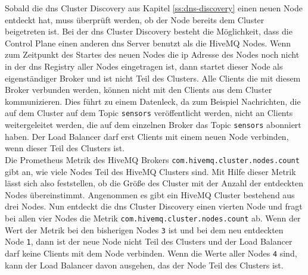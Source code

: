 Sobald die \ac{dns} Cluster Discovery aus Kapitel \ref{ss:dns-discovery} einen neuen Node entdeckt hat, muss überprüft werden, ob der Node bereits dem Cluster beigetreten ist. Bei der \ac{dns} Cluster Discovery besteht die Möglichkeit, dass die Control Plane einen anderen \ac{dns} Server benutzt als die HiveMQ Nodes. Wenn zum Zeitpunkt des Startes des neuen Nodes die \ac{ip} Adresse des Nodes noch nicht in der \ac{dns} Registry aller Nodes eingetragen ist, dann startet dieser Node als eigenständiger Broker und ist nicht Teil des Clusters.
Alle Clients die mit diesem Broker verbunden werden, können nicht mit den Clients aus dem Cluster kommunizieren. Dies führt zu einem Datenleck, da zum Beispiel Nachrichten, die auf dem Cluster auf dem Topic \verb|sensors| veröffentlicht werden, nicht an Clients weitergeleitet werden, die auf dem einzelnen Broker das Topic \verb|sensors| abonniert haben.
Der Load Balancer darf erst Clients mit einem neuen Node verbinden, wenn dieser Teil des Clusters ist.
\\
Die Prometheus Metrik des HiveMQ Brokers \verb|com.hivemq.cluster.nodes.count| gibt an, wie viele Nodes Teil des HiveMQ Clusters sind. Mit Hilfe dieser Metrik lässt sich also feststellen, ob die Grö{\ss}e des Cluster mit der Anzahl der entdeckten Nodes übereinstimmt. Angenommen es gibt ein HiveMQ Cluster bestehend aus drei Nodes. Nun entdeckt die \ac{dns} Cluster Discovery einen vierten Node und fragt bei allen vier Nodes die Metrik \verb|com.hivemq.cluster.nodes.count| ab. Wenn der Wert der Metrik bei den bisherigen Nodes \verb|3| ist und bei dem neu entdeckten Node \verb|1|, dann ist der neue Node nicht Teil des Clusters und der Load Balancer darf keine Clients mit dem Node verbinden. Wenn die Werte aller Nodes \verb|4| sind, kann der Load Balancer davon ausgehen, das der Node Teil des Clusters ist.
